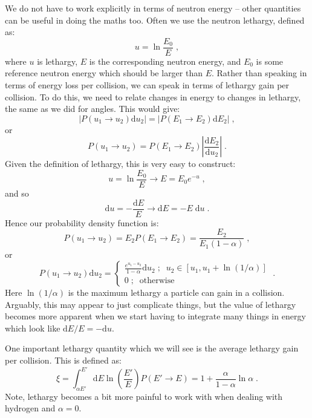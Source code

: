We do not have to work explicitly in terms of neutron energy -- other quantities can be useful in doing the maths too. Often we use the neutron lethargy, defined as:
\begin{equation*}
    u = \ln{\frac{E_0}{E}}\;\mathrm{,}
\end{equation*}
where $u$ is lethargy, $E$ is the corresponding neutron energy, and $E_0$ is some reference neutron energy which should be larger than $E$. Rather than speaking in terms of energy loss per collision, we can speak in terms of lethargy gain per collision. To do this, we need to relate changes in energy to changes in lethargy, the same as we did for angles. This would give:
\begin{equation*}
    |P(u_1\rightarrow u_2)\mathrm{d}u_2| = |P(E_1\rightarrow E_2) \mathrm{d}E_2|\;\mathrm{,}
\end{equation*}
or
\begin{equation*}
    P(u_1\rightarrow u_2) =  P(E_1\rightarrow E_2)\left|\frac{\mathrm{d}E_2}{\mathrm{d}u_2} \right|\;\mathrm{.}
\end{equation*}
Given the definition of lethargy, this is very easy to construct:
\begin{equation*}
    u = \ln{\frac{E_0}{E}}\rightarrow E = E_0 e^{-u}\;\mathrm{,}
\end{equation*}
and so
\begin{equation*}
    \mathrm{d}u = -\frac{\mathrm{d}E}{E} \rightarrow \mathrm{d}E = -E\;\mathrm{d}u\;\mathrm{.}
\end{equation*}
Hence our probability density function is:
\begin{equation*}
    P(u_1\rightarrow u_2) = E_2 P(E_1\rightarrow E_2) = \frac{E_2}{E_1(1-\alpha)}\;\mathrm{,}
\end{equation*}
or
\begin{equation*}
    P(u_1\rightarrow u_2)\mathrm{d}u_2 = \left\{\begin{array}{ll}
      \frac{e^{u_1-u_2} }{1-\alpha}\mathrm{d}u_2\;\mathrm{;}\;\; u_2\in [u_1, u_1 + \ln{(1/\alpha)}]\\
      0\;\mathrm{;}\;\;\mathrm{ otherwise}
      \end{array} 
      \right.
   \;\mathrm{.}
\end{equation*}
Here $\ln (1/\alpha)$ is the maximum lethargy a particle can gain in a collision. Arguably, this may appear to just complicate things, but the value of lethargy becomes more apparent when we start having to integrate many things in energy which look like $\mathrm{d}E/E = -\mathrm{d}u$.

One important lethargy quantity which we will see is the average lethargy gain per collision. This is defined as:
\begin{equation*}
    \xi =\int^{E'}_{\alpha E'}\mathrm{d}E \ln\left(\frac{E'}{E}\right)P(E'\rightarrow E) = 1 + \frac{\alpha}{1-\alpha}\ln\alpha\;\mathrm{.}
\end{equation*}
Note, lethargy becomes a bit more painful to work with when dealing with hydrogen and $\alpha=0$.






